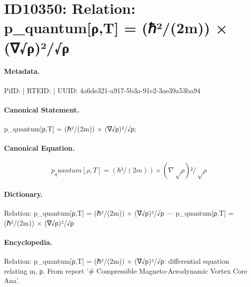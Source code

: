 \section*{ID10350: Relation: p\_quantum[ρ,T] = (ℏ²/(2m)) × (∇√ρ)²/√ρ}
\paragraph{Metadata.}
PiID:  | RTEID:  | UUID: 4a6de321-a917-5b3a-91e2-3ae39a53ba94

\paragraph{Canonical Statement.}
p\_quantum[ρ,T] = (ℏ²/(2m)) × (∇√ρ)²/√ρ;

\paragraph{Canonical Equation.}
\[
p_quantum[ρ,T] = (ℏ²/(2m)) × (∇√ρ)²/√ρ
\]

\paragraph{Dictionary.}
Relation: p\_quantum[ρ,T] = (ℏ²/(2m)) × (∇√ρ)²/√ρ — p\_quantum[ρ,T] = (ℏ²/(2m)) × (∇√ρ)²/√ρ

\paragraph{Encyclopedia.}
Relation: p\_quantum[ρ,T] = (ℏ²/(2m)) × (∇√ρ)²/√ρ: differential equation relating m, ρ. From report '\# Compressible Magneto-Aerodynamic Vortex Core Ana'.
